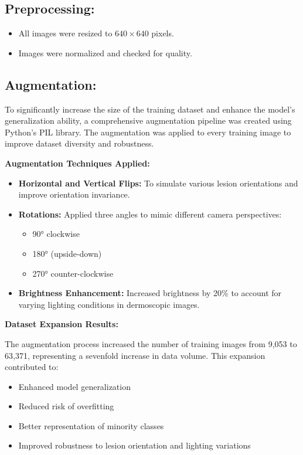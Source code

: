 \documentclass[a4paper,12pt]{report}
\begin{document}
\begin{spacing}{1.5}
    \newpage
    \subsection{Preprocessing:}
    \begin{itemize}
        \item All images were resized to $640 \times 640$ pixels.
        \item Images were normalized and checked for quality.
    \end{itemize}
    
    \subsection{Augmentation:}
    
    To significantly increase the size of the training dataset and enhance the model's generalization ability, a comprehensive augmentation pipeline was created using Python's PIL library. The augmentation was applied to every training image to improve dataset diversity and robustness.

    \textbf{Augmentation Techniques Applied:}
    \begin{itemize}
        \item \textbf{Horizontal and Vertical Flips:} To simulate various lesion orientations and improve orientation invariance.
        \item \textbf{Rotations:} Applied three angles to mimic different camera perspectives:
        \begin{itemize}
            \item 90° clockwise
            \item 180° (upside-down)
            \item 270° counter-clockwise
        \end{itemize}
        \item \textbf{Brightness Enhancement:} Increased brightness by 20\% to account for varying lighting conditions in dermoscopic images.
    \end{itemize}
    
    \textbf{Dataset Expansion Results:}
    
    The augmentation process increased the number of training images from 9,053 to 63,371, representing a sevenfold increase in data volume. This expansion contributed to:
    \begin{itemize}
        \item Enhanced model generalization
        \item Reduced risk of overfitting
        \item Better representation of minority classes
        \item Improved robustness to lesion orientation and lighting variations
    \end{itemize}
    

\end{spacing}
\end{document}
